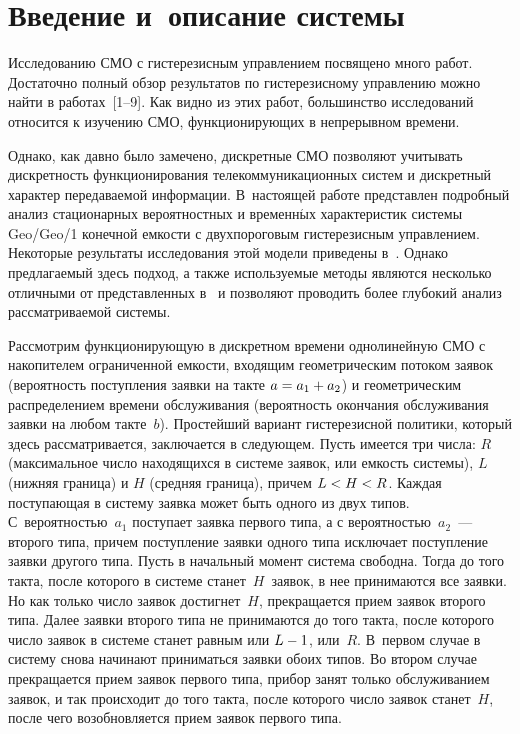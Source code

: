       \begin{multicols}{2}

            \label{st\stat}



\section{Введение и~описание системы}


Исследованию СМО с гистерезисным
управлением посвящено много работ. Достаточно полный обзор
результатов по гистерезисному управлению можно найти в работах~[1--9].
Как видно из этих работ, большинство исследований относится
к изучению СМО, функционирующих в непрерывном времени.

Однако, как давно было замечено, дискретные СМО
позволяют учитывать дискретность функционирования
телекоммуникационных систем и дискретный характер
передаваемой информации.
В~насто\-ящей работе представлен подробный анализ
стационарных вероятностных и временн$\acute{\mbox{ы}}$х характеристик
сис\-те\-мы Geo/Geo/1 конечной емкости с двухпороговым
гистерезисным управлением.
Некоторые результаты исследования этой модели приведены в~\cite{38-p}.
Однако предлагаемый здесь подход, а также используемые
методы являются несколько отличными от представленных
в~\cite{38-p} и позволяют проводить более глубокий анализ
рассматриваемой системы.


Рассмотрим функционирующую в дискретном времени
однолинейную СМО с накопителем ограниченной емкости,
входящим геометрическим потоком заявок (вероятность
поступления заявки на такте ${a\hm=a_1\hm+a_2}$) и
геометрическим распределением времени обслуживания (вероятность
окончания обслуживания заявки на любом такте~$b$).
Прос\-тей\-ший вариант гистерезисной политики, который
здесь рассматривается, заключается в сле\-ду\-ющем.
Пусть имеется три числа: $R$ (максимальное чис\-ло
находящихся в системе заявок, или емкость системы),
$L$ (нижняя граница) и $H$ (средняя граница), причем ${L \hm< H \hm< R}$.
Каждая поступающая в систему заявка может быть одного из двух типов.
С~вероятностью~$a_1$ поступает заявка первого типа,
а с вероятностью~$a_2$~--- второго типа, причем поступление заявки одного типа исключает
поступление заявки другого типа.
Пусть в начальный момент система свободна.
Тогда до того такта, после которого в системе
станет~$H$~заявок, в нее принимаются все заявки.
Но как только число заявок достигнет~$H$, прекращается
прием заявок второго типа.
Далее заявки второго типа не принимаются до того
такта, после которого число заявок в системе станет
равным или ${L\hm-1}$, или~$R$.
В~первом случае в систему снова начинают
приниматься заявки обоих типов.
Во втором случае прекращается прием заявок первого
типа, прибор занят только обслуживанием заявок, и
так происходит до того такта, после которого число
заявок станет~$H$, после чего возобновляется прием
заявок первого типа.


\end{multicols}
